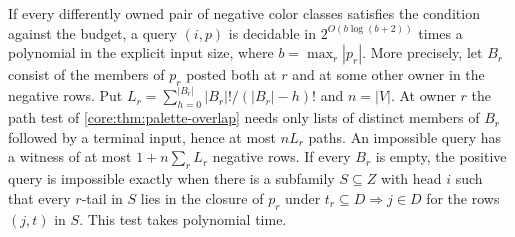 \begin{corollary}
\label{core:cor:triangle-free-marked-paths}
If every differently owned pair of negative color classes satisfies
the condition against the budget,
a query $(i,p)$ is decidable in
$2^{O(b\log(b+2))}$ times a polynomial in the explicit input size,
where $b=\max_r|p_r|$. More precisely, let $B_r$ consist of the
members of $p_r$ posted both at $r$ and at some other owner in the
negative rows. Put $L_r=\sum_{h=0}^{|B_r|}|B_r|!/(|B_r|-h)!$ and
$n=|V|$. At owner $r$
the path test of \cref{core:thm:palette-overlap} needs only lists of
distinct members of $B_r$ followed by a terminal input, hence at most
$nL_r$ paths. An impossible query has a witness of at most
$1+n\sum_r L_r$ negative rows. If every $B_r$ is empty, the positive
query is impossible exactly when there is a subfamily $S\subseteq Z$
with head $i$ such that every $r$-tail in $S$ lies in the closure of
$p_r$ under $t_r\subseteq D\Rightarrow j\in D$ for the rows $(j,t)$
in $S$. This test takes polynomial time.
\end{corollary}
